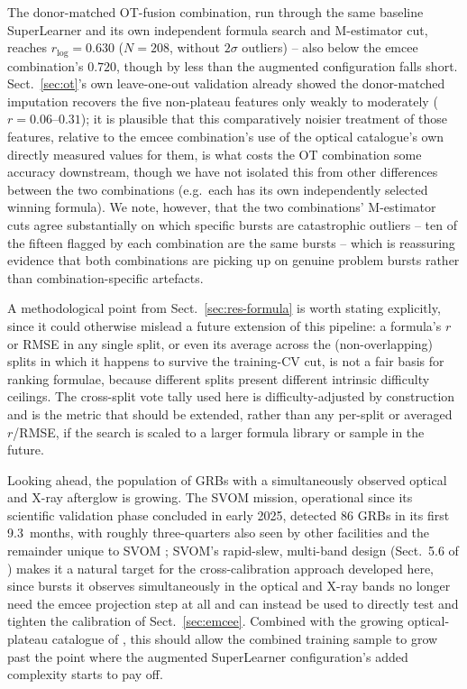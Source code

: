 \documentclass{aa}
\begin{document}
The donor-matched OT-fusion combination, run through the same baseline
SuperLearner and its own independent formula search and M-estimator cut, reaches
$r_{\log}=0.630$ ($N=208$, without $2\sigma$ outliers) -- also below the emcee
combination's $0.720$, though by less than the augmented configuration falls
short. Sect.~\ref{sec:ot}'s own leave-one-out validation already showed the
donor-matched imputation recovers the five non-plateau features only weakly to
moderately ($r=0.06$--$0.31$); it is plausible that this comparatively noisier
treatment of those features, relative to the emcee combination's use of the
optical catalogue's own directly measured values for them, is what costs the OT
combination some accuracy downstream, though we have not isolated this from
other differences between the two combinations (e.g.\ each has its own
independently selected winning formula). We note, however, that the two
combinations' M-estimator cuts agree substantially on which specific bursts are
catastrophic outliers -- ten of the fifteen flagged by each combination are the
same bursts -- which is reassuring evidence that both combinations are picking
up on genuine problem bursts rather than combination-specific artefacts.

A methodological point from Sect.~\ref{sec:res-formula} is worth stating
explicitly, since it could otherwise mislead a future extension of this
pipeline: a formula's $r$ or RMSE in any single split, or even its average
across the (non-overlapping) splits in which it happens to survive the
training-CV cut, is not a fair basis for ranking formulae, because different
splits present different intrinsic difficulty ceilings. The cross-split vote
tally used here is difficulty-adjusted by construction and is the metric that
should be extended, rather than any per-split or averaged $r$/RMSE, if the
search is scaled to a larger formula library or sample in the future.

Looking ahead, the population of GRBs with a simultaneously observed optical
and X-ray afterglow is growing. The SVOM mission, operational since its
scientific validation phase concluded in early 2025, detected 86 GRBs in its
first 9.3~months, with roughly three-quarters also seen by other facilities
and the remainder unique to SVOM \citep{daigne2026}; SVOM's rapid-slew,
multi-band design (Sect.~5.6 of \citealt{narendra2025}) makes it a natural
target for the cross-calibration approach developed here, since bursts it
observes simultaneously in the optical and X-ray bands no longer need the
emcee projection step at all and can instead be used to directly test and
tighten the calibration of Sect.~\ref{sec:emcee}. Combined with the growing
optical-plateau catalogue of \citet{dainotti2024a}, this should allow the
combined training sample to grow past the point where the augmented
SuperLearner configuration's added complexity starts to pay off.
\end{document}
